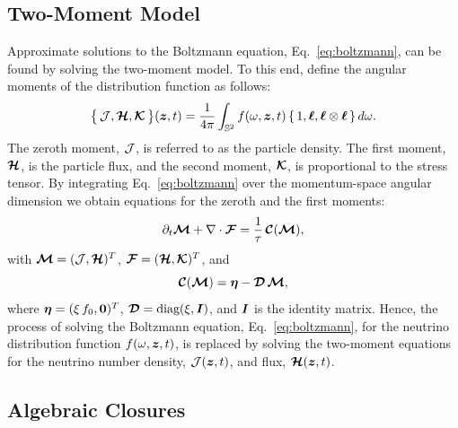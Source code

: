 \subsection{Two-Moment Model}

Approximate solutions to the Boltzmann equation, Eq.~\eqref{eq:boltzmann}, can be found by solving the two-moment model.
To this end, define the angular moments of the distribution function as follows:
\begin{equation}
  \big\{\,\mathcal{J},\boldsymbol{\mathcal{H}},\boldsymbol{\mathcal{K}}\,\big\}(\boldsymbol{z},t)
  =\frac{1}{4\pi}\int_{\mathbb{S}^{2}}f(\omega,\boldsymbol{z},t)\,\{\,1,\boldsymbol{\ell},\boldsymbol{\ell}\otimes\boldsymbol{\ell}\,\}\,d\omega.
  \label{eq:angularMoments}
\end{equation}  
The zeroth moment, $\mathcal{J}$, is referred to as the particle density.  
The first moment, $\boldsymbol{\mathcal{H}}$, is the particle flux, and the second moment, $\boldsymbol{\mathcal{K}}$, is proportional to the stress tensor.  
By integrating Eq.~\eqref{eq:boltzmann} over the momentum-space angular dimension we obtain equations for the zeroth and the first moments:
\begin{equation}
  \partial_{t}{\boldsymbol{\mathcal{M}}}+\nabla\cdot\boldsymbol{\mathcal{F}}=\frac{1}{\tau}\,\boldsymbol{\mathcal{C}}(\boldsymbol{\mathcal{M}}),
  \label{eq:momentEquations}
\end{equation}
with $\boldsymbol{\mathcal{M}}=(\mathcal{J},\boldsymbol{\mathcal{H}})^{T}$, $\boldsymbol{\mathcal{F}}=(\boldsymbol{\mathcal{H}},\boldsymbol{\mathcal{K}})^{T}$, and
\begin{equation}
  \boldsymbol{\mathcal{C}}(\boldsymbol{\mathcal{M}})=\boldsymbol{\eta}-\boldsymbol{\mathcal{D}}\,\boldsymbol{\mathcal{M}},
  \label{eq:collisionTermMoments}
\end{equation}
where $\boldsymbol{\eta}=(\xi\,f_{0},\boldsymbol{0})^{T}$, $\boldsymbol{\mathcal{D}}=\mbox{diag}(\xi,\boldsymbol{I})$, and
$\boldsymbol{I}$ is the identity matrix.
Hence, the process of solving the Boltzmann equation, Eq.~\eqref{eq:boltzmann}, for the neutrino distribution function $f(\omega,\boldsymbol{z},t)$, is replaced by solving the two-moment equations for the neutrino number density, $\mathcal{J}(\boldsymbol{z},t)$, and flux, $\boldsymbol{\mathcal{H}}(\boldsymbol{z},t)$.  

\subsection{Algebraic Closures}

